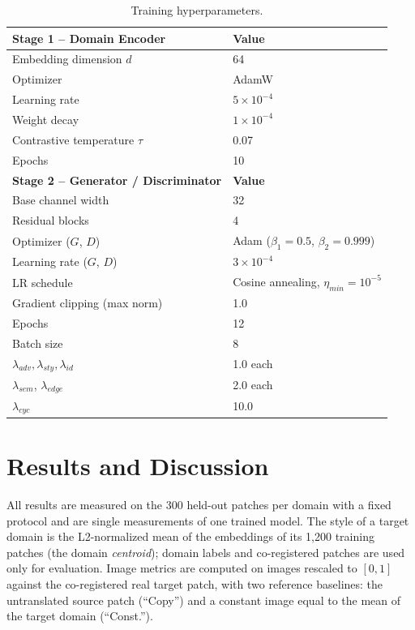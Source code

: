 \documentclass[runningheads]{llncs}
\begin{document}
\begin{table}[t]
\centering
\caption{Training hyperparameters.}
\label{tab:hyperparams}
\begin{tabular}{@{}ll@{}}
\toprule
\textbf{Stage 1 -- Domain Encoder} & \textbf{Value} \\
\midrule
Embedding dimension $d$            & 64 \\
Optimizer                          & AdamW \\
Learning rate                      & $5\times10^{-4}$ \\
Weight decay                       & $1\times10^{-4}$ \\
Contrastive temperature $\tau$     & 0.07 \\
Epochs                             & 10 \\
\midrule
\textbf{Stage 2 -- Generator / Discriminator} & \textbf{Value} \\
\midrule
Base channel width                 & 32 \\
Residual blocks                    & 4 \\
Optimizer ($G$, $D$)               & Adam ($\beta_1{=}0.5$, $\beta_2{=}0.999$) \\
Learning rate ($G$, $D$)           & $3\times10^{-4}$ \\
LR schedule                        & Cosine annealing, $\eta_{min}{=}10^{-5}$ \\
Gradient clipping (max norm)       & 1.0 \\
Epochs                             & 12 \\
Batch size                         & 8 \\
$\lambda_{adv},\lambda_{sty},\lambda_{id}$ & 1.0 each \\
$\lambda_{sem}$, $\lambda_{edge}$  & 2.0 each \\
$\lambda_{cyc}$                    & 10.0 \\
\bottomrule
\end{tabular}
\end{table}

\section{Results and Discussion}
\label{sec:results}
All results are measured on the 300 held-out patches per domain with a fixed protocol and are single measurements of one trained model. The style of a target domain is the L2-normalized mean of the embeddings of its 1{,}200 training patches (the domain \emph{centroid}); domain labels and co-registered patches are used only for evaluation. Image metrics are computed on images rescaled to $[0,1]$ against the co-registered real target patch, with two reference baselines: the untranslated source patch (``Copy'') and a constant image equal to the mean of the target domain (``Const.'').
\end{document}
